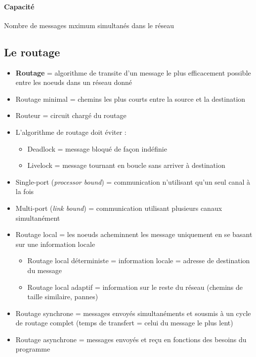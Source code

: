 \documentclass[12pt,a4paper,oneside, titlepage]{article}
\begin{document}
      \paragraph{Capacité} Nombre de messages mximum simultanés dans le réseau

    \subsection*{Le routage}

      \begin{itemize}
        \item \textbf{Routage} = algorithme de transite d'un message le plus efficacement possible entre les noeuds dans un réseau donné
        \item Routage minimal = chemins les plus courts entre la source et la destination
        \item Routeur = circuit chargé du routage
        \item L'algorithme de routage doit éviter :
        \begin{itemize}
          \item Deadlock = message bloqué de façon indéfinie
          \item Livelock = message tournant en boucle sans arriver à destination
        \end{itemize}
        \item Single-port (\textit{processor bound}) = communication n’utilisant qu’un seul canal à la fois
        \item Multi-port (\textit{link bound}) = communication utilisant plusieurs canaux simultanément
        \item Routage local = les noeuds acheminnent les message uniquement en se basant sur une information locale
        \begin{itemize}
          \item Routage local déterministe = information locale = adresse de destination du message
          \item Routage local adaptif = information sur le reste du réseau (chemins de taille similaire, pannes)
        \end{itemize}
        \item Routage synchrone = messages envoyés simultanéments et sousmis à un cycle de routage complet (temps de transfert = celui du message le plus lent)
        \item Routage asynchrone = messages envoyés et reçu en fonctions des besoins du programme
      \end{itemize}
\end{document}
